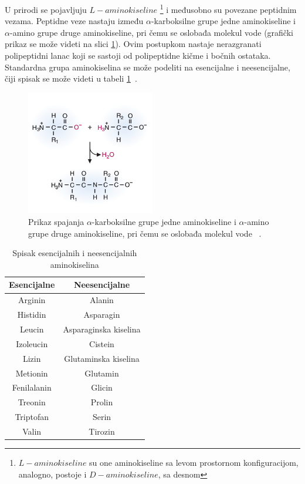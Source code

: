 U prirodi se pojavljuju $L-aminokiseline$ \footnote{$L-aminokiseline$ su one aminokiseline sa levom prostornom konfiguracijom, analogno, postoje i $D-aminokiseline$, sa desnom} i međusobno su povezane peptidnim vezama. Peptidne veze nastaju između $\alpha$-karboksilne grupe jedne aminokiseline i $\alpha$-amino grupe druge aminokiseline, pri čemu se oslobađa molekul vode (grafički prikaz se može videti na slici \ref{fig:peptidebonds}). Ovim postupkom nastaje nerazgranati polipeptidni lanac koji se sastoji od polipeptidne kičme i bočnih ostataka. Standardna grupa aminokiselina se može podeliti na esencijalne i
neesencijalne, čiji spisak se može videti u tabeli \ref{table:1}~\cite{MarijaJ,biopathways}.\\ 

\begin{figure}[H]
	\centering
    \includegraphics[width=0.5\textwidth]{Figures/BO/peptide_bonds.png}
    \caption{Prikaz spajanja $\alpha$-karboksilne grupe jedne aminokiseline i $\alpha$-amino grupe druge aminokiseline, pri čemu se oslobađa molekul vode ~\cite{bmbg}.}
    \label{fig:peptidebonds}
\end{figure}

\begin{table}[h!]
\centering
	\begin{tabular}{||c c||} 
	\hline 
	Esencijalne & Neesencijalne \\ [0.5ex] 
	\hline\hline
	Arginin & Alanin \\ 
	\hline
	Histidin & Asparagin \\
	\hline
	Leucin & Asparaginska kiselina\\
	\hline
	Izoleucin & Cistein \\
	\hline
	Lizin & Glutaminska kiselina \\ [1ex] 
	\hline
	Metionin & Glutamin \\ [1ex] 
	\hline
	Fenilalanin & Glicin \\ [1ex] 
	\hline
	Treonin & Prolin \\ [1ex] 
	\hline
	Triptofan & Serin \\ [1ex] 
	\hline
	Valin & Tirozin \\ [1ex] 
	\hline
	\end{tabular}
\caption{Spisak esencijalnih i neesencijalnih aminokiselina}
\label{table:1}
\end{table}

